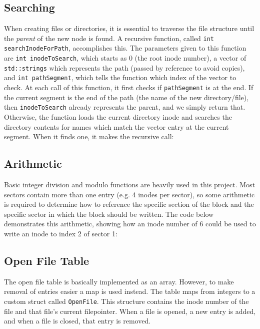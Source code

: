 \documentclass[]{article}
\begin{document}
\subsection{Searching}
When creating files or directories, it is essential to traverse the file structure until the \emph{parent} of the new node is found. A recursive function, called \texttt{int searchInodeForPath}, accomplishes this. The parameters given to this function are \texttt{int inodeToSearch}, which starts as 0 (the root inode number), a vector of \texttt{std::strings} which represents the path (passed by reference to avoid copies), and \texttt{int pathSegment}, which tells the function which index of the vector to check. At each call of this function, it first checks if \texttt{pathSegment} is at the end. If the current segment is the end of the path (the name of the new directory/file), then \texttt{inodeToSearch} already represents the parent, and we simply return that. Otherwise, the function loads the current directory inode and searches the directory contents for names which match the vector entry at the current segment. When it finds one, it makes the recursive call:


\subsection{Arithmetic}
Basic integer division and modulo functions are heavily used in this project. Most sectors contain more than one entry (e.g. 4 inodes per sector), so some arithmetic is required to determine how to reference the specific section of the block and the specific sector in which the block should be written. The code below demonstrates this arithmetic, showing how an inode number of 6 could be used to write an inode to index 2 of sector 1:


\subsection{Open File Table}
The open file table is basically implemented as an array. However, to make removal of entries easier a map is used instead. The table maps from integers to a custom struct called \texttt{OpenFile}. This structure contains the inode number of the file and that file's current filepointer. When a file is opened, a new entry is added, and when a file is closed, that entry is removed.
\end{document}
